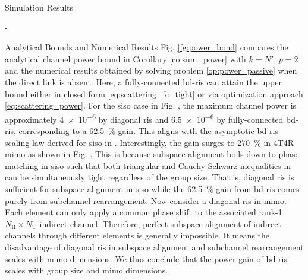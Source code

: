 \begin{section}{Simulation Results}
\begin{subsection}{-}
\begin{subsubsection}{Analytical Bounds and Numerical Results}
			Fig. \ref{fg:power_bond} compares the analytical channel power bound in Corollary \ref{co:sum_power} with $k=N'$, $p=2$ and the numerical results obtained by solving problem \eqref{op:power_passive} when the direct link is absent.
			Here, a fully-connected \gls{bd}-\gls{ris} can attain the upper bound either in closed form \eqref{eq:scattering_fc_tight} or via optimization approach \eqref{eq:scattering_power}.
			For the \gls{siso} case in Fig. , the maximum channel power is approximately \num{4e-6} by diagonal \gls{ris} and \num{6.5e-6} by fully-connected \gls{bd}-\gls{ris}, corresponding to a \qty{62.5}{\percent} gain.
			This aligns with the asymptotic \gls{bd}-\gls{ris} scaling law derived for \gls{siso} in \cite{Shen2020a}.
			Interestingly, the gain surges to \qty{270}{\percent} in 4T4R \gls{mimo} as shown in Fig. .
			This is because subspace alignment boils down to phase matching in \gls{siso} such that both triangular and Cauchy-Schwarz inequalities in \cite[(50)]{Shen2020a} can be simultaneously tight regardless of the group size.
			That is, diagonal \gls{ris} is sufficient for subspace alignment in \gls{siso} while the \qty{62.5}{\percent} gain from \gls{bd}-\gls{ris} comes purely from subchannel rearrangement.
			Now consider a diagonal \gls{ris} in \gls{mimo}.
			Each element can only apply a common phase shift to the associated rank-1 $N_\mathrm{R} \times N_\mathrm{T}$ indirect channel.
			Therefore, perfect subspace alignment of indirect channels through different elements is generally impossible.
			It means the disadvantage of diagonal \gls{ris} in subspace alignment and subchannel rearrangement scales with \gls{mimo} dimensions.
			We thus conclude that the power gain of \gls{bd}-\gls{ris} scales with group size and \gls{mimo} dimensions.
		\end{subsubsection}



\end{subsection}
\end{section}

